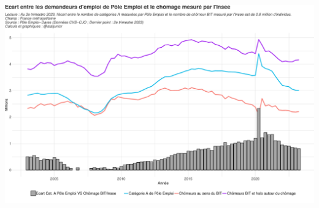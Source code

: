 \documentclass[
  paper=a4,
  ,captions=tableheading
]{scrartcl}
\begin{document}
\includegraphics{rapport_activite_emploi_chomage_insee_files/figure-latex/unnamed-chunk-32-1.pdf}
\end{document}
